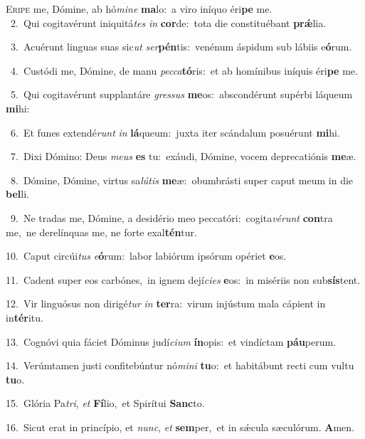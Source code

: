 \lettrine{\initial\textcolor{\initialcolor}{E}}{ripe} me, Dómine, ab hó\-\textit{mi}\-\textit{ne} \textbf{ma}\-lo:~\star a viro iníquo éri\textbf{pe} me.\\
{\numbfont\textcolor{\numbcolor}{~2.}}~Qui cogitavérunt iniquitá\textit{tes} \textit{in} \textbf{cor}\-de:~\star tota die constituébant \textbf{prǽ}\-lia.\par
{\numbfont\textcolor{\numbcolor}{~3.}}~Acuérunt linguas suas sic\textit{ut} \textit{ser}\-\textbf{pén}tis:~\star venénum áspidum sub lábiis e\-\textbf{ó}\-rum.\par
{\numbfont\textcolor{\numbcolor}{~4.}}~Custódi me, Dómine, de manu \textit{pec}\-\textit{ca}\textbf{tó}ris:~\star et ab homínibus iníquis éri\textbf{pe} me.\par
{\numbfont\textcolor{\numbcolor}{~5.}}~Qui cogitavérunt supplantáre \textit{gres}\-\textit{sus} \textbf{me}\-os:~\star abscondérunt supérbi láqueum \textbf{mi}\-hi:\par
{\numbfont\textcolor{\numbcolor}{~6.}}~Et funes extendé\textit{runt} \textit{in} \textbf{lá}\-queum:~\star juxta iter scándalum posuérunt \textbf{mi}\-hi.\par
{\numbfont\textcolor{\numbcolor}{~7.}}~Dixi Dómino: Deus \textit{me}\-\textit{us} \textbf{es} tu:~\star exáudi, Dómine, vocem deprecatiónis \textbf{me}\-æ.\par
{\numbfont\textcolor{\numbcolor}{~8.}}~Dómine, Dómine, virtus sa\-\textit{lú}\-\textit{tis} \textbf{me}\-æ:~\star obumbrásti super caput meum in die \textbf{bel}\-li.\par
{\numbfont\textcolor{\numbcolor}{~9.}}~Ne tradas me, Dómine, a desidério meo peccatóri:~\dagger cogita\-\textit{vé}\-\textit{runt} \textbf{con}\-tra me,~\star ne derelínquas me, ne forte exal\-\textbf{tén}\-tur.\par
{\numbfont\textcolor{\numbcolor}{10.}}~Caput circúi\textit{tus} \textit{e}\-\textbf{ó}rum:~\star labor labiórum ipsórum opériet \textbf{e}\-os.\par
{\numbfont\textcolor{\numbcolor}{11.}}~Cadent super eos carbónes,~\dagger in ignem dejí\-\textit{ci}\-\textit{es} \textbf{e}\-os:~\star in misériis non sub\-\textbf{sís}\-tent.\par
{\numbfont\textcolor{\numbcolor}{12.}}~Vir linguósus non dirigé\textit{tur} \textit{in} \textbf{ter}\-ra:~\star virum injústum mala cápient in in\-\textbf{tér}\-itu.\par
{\numbfont\textcolor{\numbcolor}{13.}}~Cognóvi quia fáciet Dóminus judí\-\textit{ci}\-\textit{um} \textbf{ín}\-opis:~\star et vindíctam \textbf{páu}\-perum.\par
{\numbfont\textcolor{\numbcolor}{14.}}~Verúmtamen justi confitebúntur nó\-\textit{mi}\-\textit{ni} \textbf{tu}\-o:~\star et habitábunt recti cum vultu \textbf{tu}\-o.\par
{\numbfont\textcolor{\numbcolor}{15.}}~Glória Pa\-\textit{tri}\-, \textit{et} \textbf{Fí}\-lio,~\star et Spirítui \textbf{Sanc}\-to.\par
{\numbfont\textcolor{\numbcolor}{16.}}~Sicut erat in princípio, et \textit{nunc}\-, \textit{et} \textbf{sem}\-per,~\star et in sǽcula sæculórum. \textbf{A}\-men.\par
